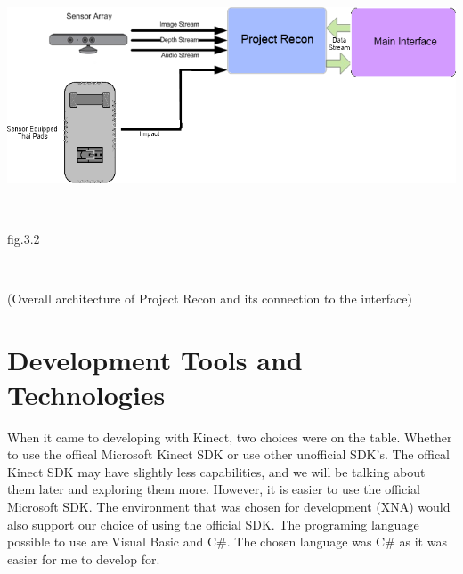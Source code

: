 \documentclass[11pt]{article} %
\begin{document}
\\
\\
\centerline{\includegraphics[scale=0.8]{general_overview.png}}
\\
\centerline{fig.3.2}
\\
\centerline{(Overall architecture of Project Recon and its connection to the interface)}
\section{Development Tools and Technologies}
When it came to developing with Kinect, two choices were on the table. Whether to use the offical Microsoft Kinect SDK or use other unofficial SDK's. The offical Kinect SDK may have slightly less capabilities, and we will be talking about them later and exploring them more. However, it is easier to use the official Microsoft SDK. The environment that was chosen for development (XNA) would also support our choice of using the official SDK. The programing language possible to use are Visual Basic and C\#. The chosen language was C\# as it was easier for me to develop for.   
\end{document}
